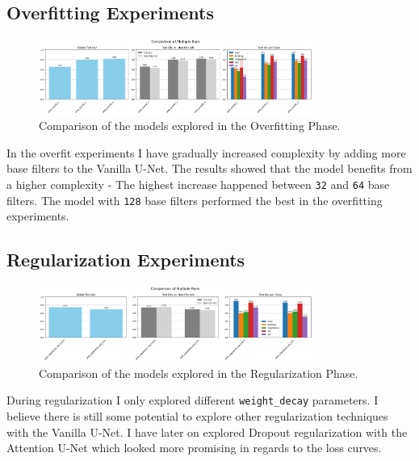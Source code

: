 \subsection{Overfitting Experiments}

\begin{figure}[h] 
    \centering 
    \includegraphics[width=0.8\textwidth]{figures/overfit_comparison.png} 
    \caption{Comparison of the models explored in the Overfitting Phase.}
    \label{fig:overfit_comparison} 
\end{figure}

In the overfit experiments I have gradually increased complexity by adding more base filters to the Vanilla U-Net. The results showed that the model benefits from a higher complexity - The highest increase happened between \texttt{32} and \texttt{64} base filters. The model with \texttt{128} base filters performed the best in the overfitting experiments.

\subsection{Regularization Experiments}

\begin{figure}[h] 
    \centering 
    \includegraphics[width=0.8\textwidth]{figures/regularization_comparison.png} 
    \caption{Comparison of the models explored in the Regularization Phase.} 
    \label{fig:regularization_comparison} 
\end{figure}

During regularization I only explored different \texttt{weight\_decay} parameters. I believe there is still some potential to explore other regularization techniques with the Vanilla U-Net. I have later on explored Dropout regularization with the Attention U-Net which looked more promising in regards to the loss curves.

